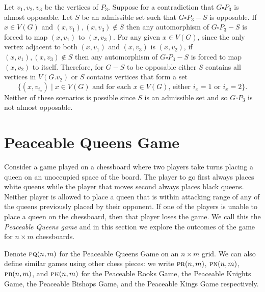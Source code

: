 \documentclass[11pt]{article}
\theoremstyle{definition}
\begin{document}
Let $v_1,v_2,v_3$ be the vertices of $P_3$. Suppose for a contradiction
that $G\square P_3$ is almost opposable. Let $S$ be an admissible set such
that $G\square P_3 - S$ is opposable. If $x\in V(G)$ and $(x,v_1), (x,v_3)
\notin S$ then any automorphism of $G\square P_3 -S$ is forced to map
$(x,v_1)$ to $(x,v_3)$. For any given $x\in V(G)$, since the only vertex
adjacent to both $(x,v_1)$ and $(x,v_3)$ is $(x,v_2)$, if $(x,v_1), (x,v_3)
\notin S$ then any automorphism of $G\square P_3 - S$ is forced to map
$(x,v_2)$ to itself. Therefore, for $G-S$ to be opposable either $S$
contains all vertices in $V(G.v_2)$ or $S$ contains vertices that form a
set
\[
    \{(x,v_{i_x})\mid\text{$x\in V(G)$ and for each $x\in V(G)$, either $i_x =
    1$ or $i_x = 2$}\}.
\]
Neither of these scenarios is possible since $S$ is an admissible set and so
$G\square P_3$ is not almost opposable.

\section{Peaceable Queens Game}
\label{sec: peaceable queens game}

Consider a game played on a chessboard where two players take turns placing a
queen on an unoccupied space of the board. The player to go first always places
white queens while the player that moves second always places black queens.
Neither player is allowed to place a queen that is within attacking range of
any of the queens previously placed by their opponent. If one of the players is
unable to place a queen on the chessboard, then that player loses the game. We
call this the \emph{Peaceable Queens game} and in this section we explore the
outcomes of the game for $n\times m$ chessboards.

Denote $\textsc{pq}(n,m)$ for the Peaceable Queens Game on an $n\times m$ grid.
We can also define similar games using other chess pieces: we write
$\textsc{pr}(n,m)$, $\textsc{pn}(n,m)$, $\textsc{pb}(n,m)$, and
$\textsc{pk}(n,m)$ for the Peaceable Rooks Game, the Peaceable Knights Game,
the Peaceable Bishops Game, and the Peaceable Kings Game respectively. 
\end{document}
